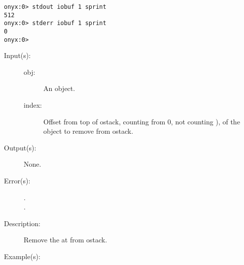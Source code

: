 \begin{description}
\begin{description}
\begin{verbatim}
onyx:0> stdout iobuf 1 sprint
512
onyx:0> stderr iobuf 1 sprint
0
onyx:0>
		\end{verbatim}
	\end{description}
\label{systemdict:ipop}
\item[{\onyxop{obj \dots index}{ipop}{\dots}}: ]
	\begin{description}\item[]
	\item[Input(s): ]
		\begin{description}\item[]
		\item[obj: ]
			An object.
		\item[index: ]
			Offset from top of ostack, counting from 0, not counting
			), of the object to remove from ostack.
		\end{description}
	\item[Output(s): ] None.
	\item[Error(s): ]
		\begin{description}\item[]
		\item[.]
		\item[.]
		\end{description}
	\item[Description: ]
		Remove the  at  from ostack.
	\item[Example(s): ]\begin{verbatim}


\end{verbatim}
\end{description}
\end{description}
